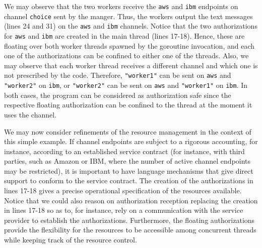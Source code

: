 We may observe that the two workers receive the \lstinline{aws} and \lstinline{ibm} endpoints on channel \lstinline{choice}
sent by the manger. Thus, the workers output the text messages (lines 24 and 31) on the \lstinline{aws} and \lstinline{ibm} channels. 
Notice that the two authorizations for \lstinline{aws} and \lstinline{ibm} are created in the main thread (lines 17-18). Hence, these are floating over both worker threads spawned by the goroutine invocation, 
and each one of the authorizations can be confined to either one of the threads. Also, we may observe that each worker thread receives a different channel and which one is
not prescribed by the code. Therefore, \lstinline{"worker1"} can be sent on \lstinline{aws} and \lstinline{"worker2"} on \lstinline{ibm}, or \lstinline{"worker2"} can be sent on \lstinline{aws} and \lstinline{"worker1"} on \lstinline{ibm}.
In both cases, the program can be considered as authorization safe since the respective floating authorization can be confined to the thread at the moment it uses the channel.

We may now consider refinements of the resource management in the context of this simple example. If channel endpoints are subject to a rigorous
accounting, for instance, according to an established service contract (for instance, with third parties, such as Amazon or IBM, where the number of active channel 
endpoints may be restricted), it is important to have language mechanisms that give direct support to conform to the service contract. The 
creation of the authorizations in lines 17-18 gives a precise operational specification of the resources available. Notice that we could also reason
on authorization reception replacing the creation in lines 17-18 so as to, for instance, rely on a communication with the service provider to establish the 
authorizations. Furthermore, the floating authorizations provide the flexibility for the resources to be accessible among concurrent threads
while keeping track of the resource control. 

